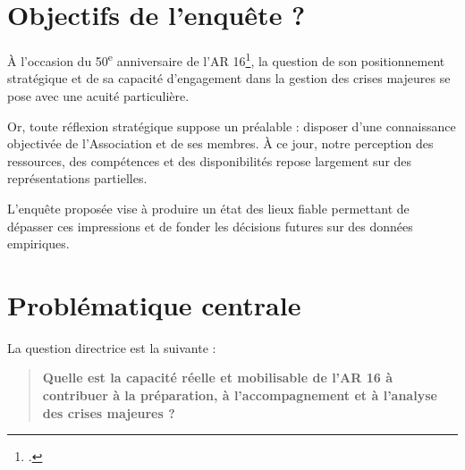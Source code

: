 \documentclass[12pt,a4paper]{article}
\begin{document}

\clearpage
{}
\tableofcontents
\clearpage
{}

\section{Objectifs de l'enquête ?}

À l'occasion du 50\textsuperscript{e} anniversaire de l'AR 16\footcite{linkedin_AR16}, la question de son positionnement stratégique et de sa capacité d'engagement dans la gestion des crises majeures se pose avec une acuité particulière. 

Or, toute réflexion stratégique suppose un préalable : disposer d'une connaissance objectivée de l'Association et de ses membres. À ce jour, notre perception des ressources, des compétences et des disponibilités repose largement sur des représentations partielles.

L'enquête proposée vise à produire un état des lieux fiable permettant de dépasser ces impressions et de fonder les décisions futures sur des données empiriques.

\section{Problématique centrale}

La question directrice est la suivante :

\begin{quote}
\textbf{Quelle est la capacité réelle et mobilisable de l'AR 16 à contribuer à la préparation, à l'accompagnement et à l'analyse des crises majeures ?}
\end{quote}
\end{document}

